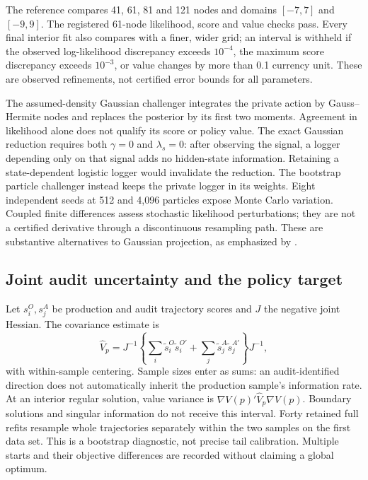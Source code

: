 The reference compares 41, 61, 81 and 121 nodes and domains $[-7,7]$ and
$[-9,9]$. The registered 61-node likelihood, score and value checks pass.
Every final interior fit also compares with a finer, wider grid; an interval
is withheld if the observed log-likelihood discrepancy exceeds $10^{-4}$,
the maximum score discrepancy exceeds $10^{-3}$, or value changes by more
than 0.1 currency unit. These are observed refinements, not certified error
bounds for all parameters.

The assumed-density Gaussian challenger integrates the private action by
Gauss--Hermite nodes and replaces the posterior by its first two moments.
Agreement in likelihood alone does not qualify its score or policy value.
The exact Gaussian reduction requires both $\gamma=0$ and $\lambda_s=0$:
after observing the signal, a logger depending only on that signal adds no
hidden-state information. Retaining a state-dependent logistic logger would
invalidate the reduction. The bootstrap particle challenger instead keeps
the private logger in its weights. Eight independent seeds at 512 and 4,096
particles expose Monte Carlo variation. Coupled finite differences assess
stochastic likelihood perturbations; they are not a certified derivative
through a discontinuous resampling path. These are substantive alternatives
to Gaussian projection, as emphasized by \citet[Chapters 6--7]{sarkka2013}.

\subsection{Joint audit uncertainty and the policy target}
Let $s_i^O,s_j^A$ be production and audit trajectory scores and $J$ the
negative joint Hessian. The covariance estimate is
\[
 \widehat V_p=J^{-1}\left\{
  \sum_i\widetilde s_i^O\widetilde s_i^{O\prime}+
  \sum_j\widetilde s_j^A\widetilde s_j^{A\prime}\right\}J^{-1},
\]
with within-sample centering. Sample sizes enter as sums: an audit-identified
direction does not automatically inherit the production sample's information
rate. At an interior regular solution, value variance is
$\nabla V(p)'\widehat V_p\nabla V(p)$. Boundary solutions and singular
information do not receive this interval. Forty retained full refits resample
whole trajectories separately within the two samples on the first data set.
This is a bootstrap diagnostic, not precise tail calibration. Multiple starts
and their objective differences are recorded without claiming a global optimum.

